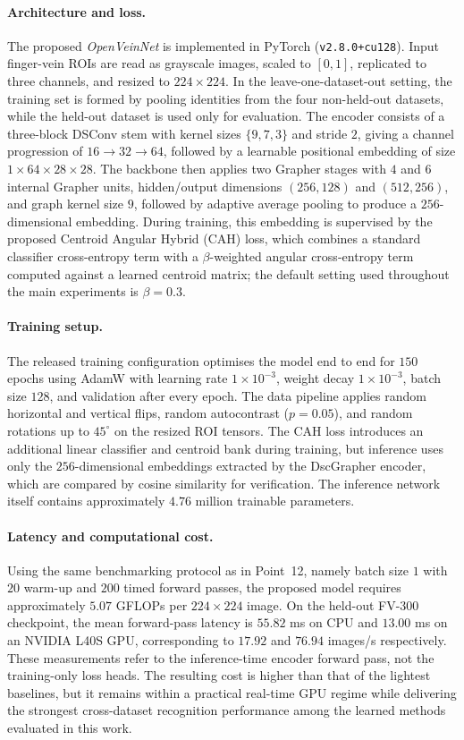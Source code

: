 \documentclass[11pt]{article}
\begin{document}
\paragraph{Architecture and loss.}
The proposed \textit{OpenVeinNet} is implemented in PyTorch (\texttt{v2.8.0+cu128}). Input finger-vein ROIs are read as grayscale images, scaled to $[0,1]$, replicated to three channels, and resized to $224\times224$. In the leave-one-dataset-out setting, the training set is formed by pooling identities from the four non-held-out datasets, while the held-out dataset is used only for evaluation. The encoder consists of a three-block DSConv stem with kernel sizes $\{9,7,3\}$ and stride $2$, giving a channel progression of $16 \rightarrow 32 \rightarrow 64$, followed by a learnable positional embedding of size $1 \times 64 \times 28 \times 28$. The backbone then applies two Grapher stages with $4$ and $6$ internal Grapher units, hidden/output dimensions $(256,128)$ and $(512,256)$, and graph kernel size $9$, followed by adaptive average pooling to produce a $256$-dimensional embedding. During training, this embedding is supervised by the proposed Centroid Angular Hybrid (CAH) loss, which combines a standard classifier cross-entropy term with a $\beta$-weighted angular cross-entropy term computed against a learned centroid matrix; the default setting used throughout the main experiments is $\beta=0.3$.

\paragraph{Training setup.}
The released training configuration optimises the model end to end for $150$ epochs using AdamW with learning rate $1\times10^{-3}$, weight decay $1\times10^{-3}$, batch size $128$, and validation after every epoch. The data pipeline applies random horizontal and vertical flips, random autocontrast ($p=0.05$), and random rotations up to $45^\circ$ on the resized ROI tensors. The CAH loss introduces an additional linear classifier and centroid bank during training, but inference uses only the $256$-dimensional embeddings extracted by the DscGrapher encoder, which are compared by cosine similarity for verification. The inference network itself contains approximately $4.76$ million trainable parameters.

\paragraph{Latency and computational cost.}
Using the same benchmarking protocol as in Point~12, namely batch size $1$ with $20$ warm-up and $200$ timed forward passes, the proposed model requires approximately $5.07$ GFLOPs per $224\times224$ image. On the held-out FV-300 checkpoint, the mean forward-pass latency is $55.82$ ms on CPU and $13.00$ ms on an NVIDIA L40S GPU, corresponding to $17.92$ and $76.94$ images/s respectively. These measurements refer to the inference-time encoder forward pass, not the training-only loss heads. The resulting cost is higher than that of the lightest baselines, but it remains within a practical real-time GPU regime while delivering the strongest cross-dataset recognition performance among the learned methods evaluated in this work.
\end{document}
